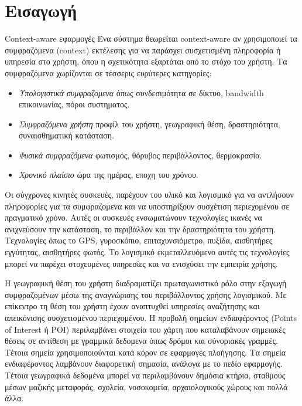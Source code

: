 \chapter{Εισαγωγή}

\begin{section}{Context-aware εφαρμογές}
\bigskip
Ένα σύστημα θεωρείται context-aware αν χρησιμοποιεί τα συμφραζόμενα (context) εκτέλεσης για να παράσχει συσχετισμένη πληροφορία ή υπηρεσία στο χρήστη, όπου η σχετικότητα εξαρτάται από το στόχο του χρήστη. Τα συμφραζόμενα χωρίζονται σε τέσσερις ευρύτερες κατηγορίες:
\begin{itemize}
\item \emph{Υπολογιστικά συμφραζομενα} όπως συνδεσιμότητα σε δίκτυο, bandwidth επικοινωνίας, πόροι συστηματος. 
\item \emph{Συμφραζόμενα χρήστη} προφίλ του χρήστη, γεωγραφική θέση, δραστηριότητα, συναισθηματική κατάσταση.
\item \emph{Φυσικά συμφραζόμενα} φωτισμός, θόρυβος περιβάλλοντος, θερμοκρασία.
\item \emph{Χρονικό πλαίσιο} ώρα της ημέρας, εποχη του χρόνου. \cite{ctxt_aware_comp}
\end{itemize}
Οι σύγχρονες κινητές συσκευές, παρέχουν του υλικό και λογισμικό για να αντλήσουν πληροφορίες για τα συμφραζομενα και να υποστηρίξουν συσχέτιση περιεχομένου σε πραγματικό χρόνο. Αυτές οι συσκευές ενσωματώνουν τεχνολογίες ικανές να ανιχνεύσουν την κατάσταση, το περιβάλλον και την δραστηριότητα του χρήστη. Τεχνολογίες όπως το GPS, γυροσκόπιο, επιταχυνσιόμετρο, πυξίδα, αισθητήρες εγγύτητας, αισθητήρες φωτός. Το λογισμικό εκμεταλλευόμενο αυτές τις τεχνολογίες μπορεί να παρέχει στοχευμένες υπηρεσίες και να ενισχύσει την εμπειρία χρήσης.
\par
Η γεωγραφική θέση του χρήστη διαδραματίζει πρωταγωνιστικό ρόλο στην εξαγωγή συμφραζομένων μέσω της αναγνώρισης του περιβάλλοντος χρήσης λογισμικού. Με επίκεντρο τη θέση του χρήστη έχουν αναπτυχθεί υπηρεσίες αναζήτησης και απεικόνισης συσχετισμένου περιεχομένου. Η προβολή σημείων ενδιαφέροντος (Points of Interest ή POI) περιλαμβάνει στοιχεία του χάρτη που καταλαβάνουν σημειακές θέσεις σε αντίθεση με γραμμικά δεδομενα όπως δρόμοι και σύνοριακές γραμμές. Τέτοια σημεία χρησιμοποιούνται κατά κόρον σε εφαρμογές πλοήγησης. Τα σημεία ενδιαφέροντος λαμβάνουν διαφορετική σημασία, ανάλογα με το πεδίο εφαρμογής. Τέτοια γεωγραφικά δεδομένα μπορεί να περιλαμβάνουν δημόσια κτήρια, σταθμούς μέσων μαζικής μεταφοράς, σχολεία, νοσοκομεία, αρχαιολογικούς χώρους και πολλά άλλα.

\end{section}


